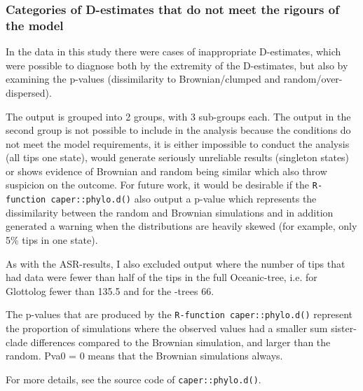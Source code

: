 \documentclass[12pt,letterpaper]{article}
\begin{document}
\subsubsection{Categories of D-estimates that do not meet the rigours of the model}
In the data in this study there were cases of inappropriate D-estimates, which were possible to diagnose both by the extremity of the D-estimates, but also by examining the p-values (dissimilarity to Brownian/clumped and random/over-dispersed). 

The output is grouped into 2 groups, with 3 sub-groups each. The output in the second group is not possible to include in the analysis because the conditions do not meet the model requirements, it is either impossible to conduct the analysis (all tips one state), would generate seriously unreliable results (singleton states) or shows evidence of Brownian and random being similar which also throw suspicion on the outcome. For future work, it would be desirable if the \texttt{R-function caper::phylo.d()} also output a p-value which represents the dissimilarity between the random and Brownian simulations and in addition generated a warning when the distributions are heavily skewed (for example, only 5\% tips in one state). 

As with the ASR-results, I also excluded output where the number of tips that had data were fewer than half of the tips in the full Oceanic-tree, i.e. for Glottolog fewer than 135.5 and for the \cite{grayetal_2009}-trees 66.

The p-values that are produced by the \texttt{R-function caper::phylo.d()} represent the proportion of simulations where the observed values had a smaller sum sister-clade differences compared to the Brownian simulation, and larger than the random. Pva0 = 0 means that the Brownian simulations always. 

For more details, see the source code of  \texttt{caper::phylo.d()}.
\end{document}
